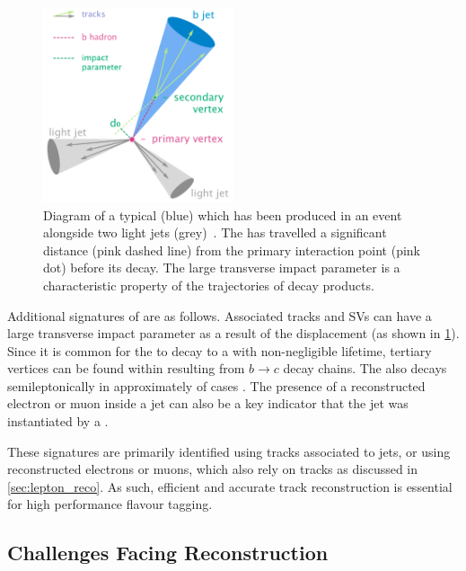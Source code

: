 \begin{figure}[!tbp]
  \centering
  \includegraphics[width=0.5\textwidth]{chapters/3.tracking/figs/b-jet-diagram.png}
  \caption{
    Diagram of a typical \bjet (blue) which has been produced in an event alongside two light jets (grey)~\cite{bjetdiagram}.
    The \bhadron has travelled a significant distance (pink dashed line) from the primary interaction point (pink dot) before its decay.
    The large transverse impact parameter \dzero is a characteristic property of the trajectories of \bhadron decay products.}
  \label{fig:bjet_diagram}
\end{figure}


Additional signatures of \bhadrons are as follows.
Associated tracks and SVs can have a large transverse impact parameter \dzero as a result of the \bhadron displacement (as shown in \cref{fig:bjet_diagram}).
Since it is common for the \bhadron to decay to a \chadron with non-negligible lifetime, tertiary vertices can be found within \bjets resulting from $b \rightarrow c$ decay chains.
The \bhadron also decays semileptonically in approximately  of cases \cite{Workman:2022ynf}.
The presence of a reconstructed electron or muon inside a jet can also be a key indicator that the jet was instantiated by a \bhadron.

These signatures are primarily identified using tracks associated to jets, or using reconstructed electrons or muons, which also rely on tracks as discussed in \cref{sec:lepton_reco}.
As such, efficient and accurate track reconstruction is essential for high performance flavour tagging.




\subsection{Challenges Facing \bhadron Reconstruction}\label{sec:b_track_reco_challenges}

